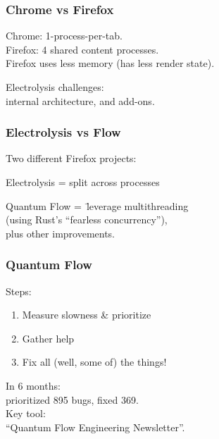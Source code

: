 \begin{frame}
\frametitle{Chrome vs Firefox}

\Large
Chrome: 1-process-per-tab.\\
Firefox: 4 shared content processes.\\[1em]

Firefox uses less memory (has less render state).

Electrolysis challenges: \\
\qquad internal architecture, and add-ons.

\end{frame}

\begin{frame}
\frametitle{Electrolysis vs Flow}
\large
Two different Firefox projects:\\[1em]
\begin{changemargin}{2em}
Electrolysis = split across processes\\
\begin{tabbing}
Quantum Flow =~\=  leverage multithreading \\
\> (using Rust's ``fearless concurrency''), \\
\> plus other improvements.
\end{tabbing}
\end{changemargin}

\end{frame}

\begin{frame}
\frametitle{Quantum Flow}
\Large
\begin{changemargin}{1cm}
Steps:\\
\begin{enumerate}
\item Measure slowness \& prioritize
\item Gather help
\item Fix all (well, some of) the things!
\end{enumerate}

In 6 months:\\
\qquad prioritized 895 bugs, fixed 369.\\
Key tool: \\
\qquad ``Quantum Flow Engineering Newsletter''.
\end{changemargin}

\end{frame}

